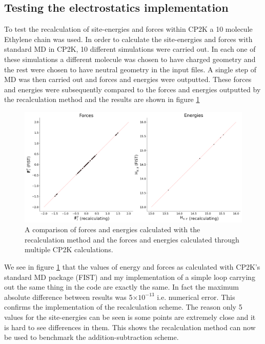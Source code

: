 \subsection{Testing the electrostatics implementation}
To test the recalculation of site-energies and forces within CP2K a 10 molecule Ethylene chain was used. In order to calculate the site-energies and forces with standard MD in CP2K, 10 different simulations were carried out. In each one of these simulations a different molecule was chosen to have charged geometry and the rest were chosen to have neutral geometry in the input files. A single step of MD was then carried out and forces and energies were outputted. These forces and energies were subsequently compared to the forces and energies outputted by the recalculation method and the results are shown in figure \ref{fig:ReCalcTest}
\begin{figure}[ht]
  \includegraphics[width=\textwidth]{./img/ES/10_mol_FIST.png}
  \caption{\label{fig:ReCalcTest}A comparison of forces and energies calculated with the recalculation method and the forces and energies calculated through multiple CP2K calculations.}
\end{figure}
We see in figure \ref{fig:ReCalcTest} that the values of energy and forces as calculated with CP2K's standard MD package (FIST) and my implementation of a simple loop carrying out the same thing in the code are exactly the same. In fact the maximum absolute difference between results was 5$\times 10^{-13}$ i.e. numerical error. This confirms the implementation of the recalculation scheme. The reason only 5 values for the site-energies can be seen is some points are extremely close and it is hard to see differences in them. This shows the recalculation method can now be used to benchmark the addition-subtraction scheme.
